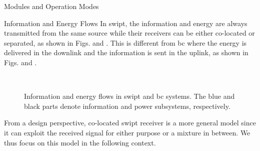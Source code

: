 \begin{section}{}
	\begin{subsection}{Modules and Operation Modes}
		\begin{subsubsection}{Information and Energy Flows}
			In \gls{swipt}, the information and energy are always transmitted from the same source while their receivers can be either co-located or separated, as shown in Figs.  and .
			This is different from \gls{bc} where the energy is delivered in the downlink and the information is sent in the uplink, as shown in Figs.  and .
			\begin{figure}[H]
				\centering
				\\
				\caption{
					Information and energy flows in \gls{swipt} and \gls{bc} systems. The blue and black parts denote information and power subsystems, respectively.
				}
				\label{fg:wipt_schemes}
			\end{figure}
			From a design perspective, co-located \gls{swipt} receiver is a more general model since it can exploit the received signal for either purpose or a mixture in between.
			We thus focus on this model in the following context.
		\end{subsubsection}


\end{subsection}
\end{section}

